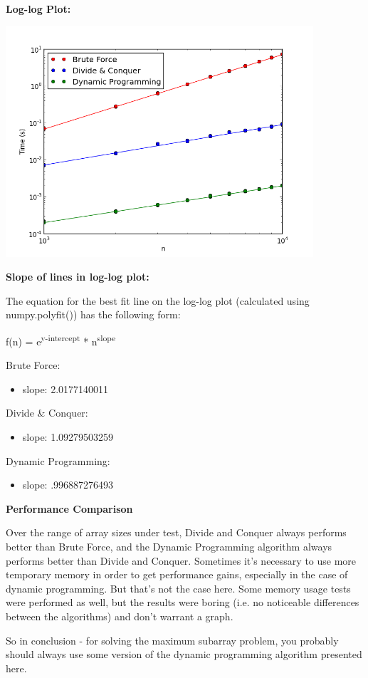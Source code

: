 \documentclass[letterpaper,10pt,titlepage,fleqn]{article}
\begin{document}
\textbf{Log-log Plot:}
\vskip 0.04in

\begin{center}
\includegraphics[width=4.5in]{loglog.png}
\end{center}

\newpage

\begin{centering}
\textbf{Slope of lines in log-log plot:}
\end{centering}

The equation for the best fit line on the log-log plot (calculated using numpy.polyfit()) has the following form:

f(n) = e\textsuperscript{y-intercept} * n\textsuperscript{slope}

Brute Force:
\begin{itemize}
\item slope: 2.0177140011
\end{itemize}

Divide \& Conquer:
\begin{itemize}
\item slope: 1.09279503259
\end{itemize}

Dynamic Programming:
\begin{itemize}
\item slope: .996887276493
\end{itemize}

\begin{centering}
\textbf{Performance Comparison}
\end{centering}

Over the range of array sizes under test, Divide and Conquer always performs better than Brute Force, and the Dynamic Programming algorithm always performs better than Divide and Conquer. Sometimes it's necessary to use more temporary memory in order to get performance gains, especially in the case of dynamic programming. But that's not the case here. Some memory usage tests were performed as well, but the results were boring (i.e. no noticeable differences between the algorithms) and don't warrant a graph. 

So in conclusion - for solving the maximum subarray problem, you probably should always use some version of the dynamic programming algorithm presented here.
\end{document}
